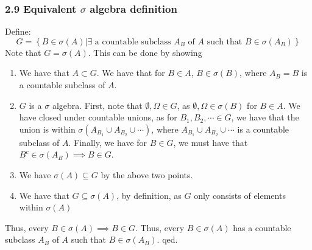 \documentclass[12pt,a4paper]{article}
\newcommand{\1}[1]{\mathbbm{1}\left\{ #1 \right\}}
\begin{document}
\subsubsection{2.9 Equivalent $\sigma$ algebra definition} Define:
$$
	G = \left\{B \in \sigma(A) | \exists 
	\text{ a countable subclass $A_B$ of $A$ such that $B \in \sigma(A_B)$}
	\right\}
$$
Note that $G = \sigma(A)$. This can be done by showing 
\begin{enumerate}
	\item We have that $A \subset G$. We have that for $B \in A$, $B \in \sigma(B)$, where $A_B = B$ is a countable subclass of $A$.
	
	\item $G$ is a $\sigma$ algebra. First, note that $\emptyset,\Omega \in G$, as $\emptyset,\Omega \in \sigma(B)$ for $B \in A$. We have closed under countable unions, as for $B_1, B_2, \cdots \in G$, we have that the union is within $\sigma(A_{B_1} \cup A_{B_2} \cup \cdots)$, where $A_{B_1} \cup A_{B_2} \cup \cdots$ is a countable subclass of $A$. Finally, we have for $B \in G$, we must have that $B^c \in \sigma(A_B) \implies B \in G$.
	
	\item We have $\sigma(A) \subseteq G$ by the above two points.
	
	\item We have that $G \subseteq \sigma(A)$, by definition, as $G$ only consists of elements within $\sigma(A)$
\end{enumerate}
Thus, every $B \in \sigma(A) \implies B \in G$. Thus, every $B \in \sigma(A)$ has a countable subclass $A_B$ of $A$ such that $B \in \sigma(A_B)$. qed.
\end{document}
